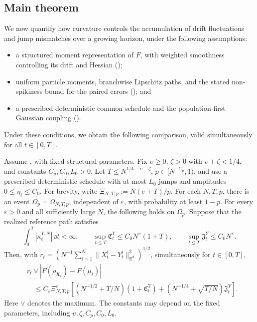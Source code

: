 \subsection{Main theorem}
\label{subsec:main-theorem}

We now quantify how curvature controls the accumulation of drift
fluctuations and jump mismatches over a growing horizon, under the following
assumptions:
\begin{itemize}[leftmargin=1.25em,itemsep=0pt,topsep=2pt,parsep=0pt]
    \item a structured moment representation of \(F\), with weighted smoothness
    controlling its drift and Hessian
    ();
    \item uniform particle moments, branchwise Lipschitz paths, and the stated
    non-spikiness bound for the paired errors
    (); and
    \item a prescribed deterministic common schedule and the population-first
    Gaussian coupling ().
\end{itemize}
Under these conditions, we obtain the following comparison, valid
simultaneously for all \(t\in[0,T]\).

\begin{theorem}
\label{theorem-main-r_t}
Assume , with fixed structural
parameters. Fix $\upsilon\ge0$, $\zeta>0$ with $\upsilon+\zeta<1/4$, and constants $C_p,C_0,L_0>0$.
Let $T\le N^{1/4-\upsilon-\zeta}$, $p\in[N^{-C_p},1)$, and use a prescribed deterministic
schedule with at most $L_0$ jumps and amplitudes $0\le\eta_\ell\le C_0$.
For brevity, write
$\Xi_{N,T,p}:=N(e+T)/p$.
For each \(N,T,p\), there is an event
$\Omega_p=\Omega_{N,T,p}$, independent of \(\varepsilon\), with probability at
least $1-p$. For every $\varepsilon>0$ and all sufficiently large $N$, the
following holds on $\Omega_p$. Suppose that the realized reference path satisfies
\[
\int_0^T|\kappa_t^{Y,N}|\,\dd t<\infty,\qquad
\sup_{t\le T}\mathfrak C_t^Y\le C_0N^\upsilon(1+T),\qquad
\sup_{t\le T}\mathfrak J_t^Y\le C_0N^\upsilon.
\]
Then, with $r_t=(N^{-1}\sum_{i=1}^N
\|X_t^i-Y_t^i\|_{\mathbb R^d}^2)^{1/2}$, simultaneously for $t\in[0,T]$,
\begin{equation}
\label{eq:objective-tracking-bound}
\begin{aligned}
&r_t\vee|F(\rho_{\mathbf X_t})-F(\mu_t)|\\
&\quad\le C_\varepsilon\Xi_{N,T,p}^{\varepsilon}
\left[(N^{-1/2}+T/N)(1+\mathfrak C_t^Y)
 +(N^{-1/4}+\sqrt{T/N})\mathfrak J_t^Y\right].
\end{aligned}
\end{equation}
Here $\vee$ denotes the maximum. The constants may depend on the fixed
parameters, including $\upsilon,\zeta,C_p,C_0,L_0$.
\end{theorem}


